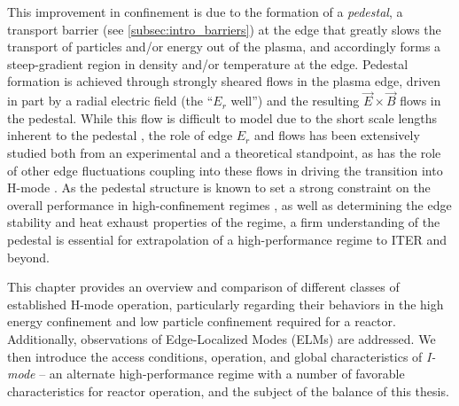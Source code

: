 This improvement in confinement is due to the formation of a \emph{pedestal}, a transport barrier (see \cref{subsec:intro_barriers}) at the edge that greatly slows the transport of particles and/or energy out of the plasma, and accordingly forms a steep-gradient region in density and/or temperature at the edge.  Pedestal formation is achieved through strongly sheared flows in the plasma edge, driven in part by a radial electric field (the ``$E_r$ well'') and the resulting $\vec{E} \times \vec{B}$ flows in the pedestal.  While this flow is difficult to model due to the short scale lengths inherent to the pedestal \cite{Kagan2010,Landreman2012}, the role of edge $E_r$ and flows has been extensively studied both from an experimental \cite{Groebner1990,Burrell1999,Terry2000,McDermott2009a} and a theoretical \cite{Shaing1989,Biglari1990,Kim1991,Ware1996,Burrell1992} standpoint, as has the role of other edge fluctuations coupling into these flows in driving the transition into H-mode \cite{Schmitz2012}.  As the 
pedestal 
structure is known to set a strong constraint on the overall performance in high-confinement regimes \cite{Kinsey2011}, as well as determining the edge stability and heat exhaust properties of the regime, a firm understanding of the pedestal is essential for extrapolation of a high-performance regime to ITER and beyond.

This chapter provides an overview and comparison of different classes of established H-mode operation, particularly regarding their behaviors in the high energy confinement and low particle confinement required for a reactor.  Additionally, observations of Edge-Localized Modes (ELMs) \cite{Zohm1996} are addressed.  We then introduce the access conditions, operation, and global characteristics of \emph{I-mode} -- an alternate high-performance regime with a number of favorable characteristics for reactor operation, and the subject of the balance of this thesis.

